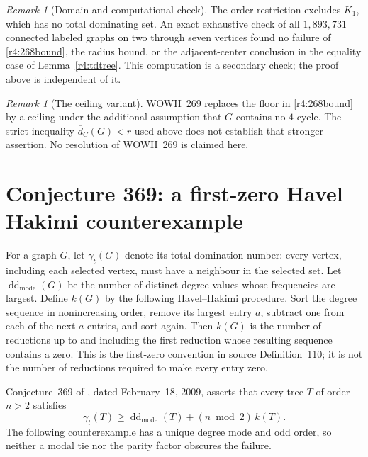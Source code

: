 \documentclass[11pt,a4paper]{article}
\theoremstyle{remark}
\newtheorem{remark}[theorem]{Remark}
\begin{document}
\begin{remark}[Domain and computational check]
\label{r4:268check}
The order restriction excludes $K_1$, which has no total dominating set.
An exact exhaustive check of all $1{,}893{,}731$ connected labeled graphs
on two through seven vertices found no failure of
\eqref{r4:268bound}, the radius bound, or the adjacent-center conclusion
in the equality case of Lemma~\ref{r4:tdtree}.
This computation is a secondary check; the proof above is independent
of it.
\end{remark}

\begin{remark}[The ceiling variant]
\label{r4:269open}
WOWII~269 replaces the floor in \eqref{r4:268bound} by a ceiling under
the additional assumption that $G$ contains no $4$-cycle.
The strict inequality $\overline d_C(G)<r$ used above does not establish
that stronger assertion.  No resolution of WOWII~269 is claimed here.
\end{remark}



\section{Conjecture 369: a first-zero Havel--Hakimi counterexample}
\label{r4:sec369}

For a graph $G$, let $\gamma_t(G)$ denote its total domination number:
every vertex, including each selected vertex, must have a neighbour in the
selected set.  Let $\operatorname{dd}_{\mathrm{mode}}(G)$ be the number of
distinct degree values whose frequencies are largest.  Define $k(G)$ by
the following Havel--Hakimi procedure.  Sort the degree sequence in
nonincreasing order, remove its largest entry $a$, subtract one from each
of the next $a$ entries, and sort again.  Then $k(G)$ is the number of
reductions up to and including the first reduction whose resulting
sequence contains a zero.  This is the first-zero convention in source
Definition~110; it is not the number of reductions required to make every
entry zero.

Conjecture~369 of \cite{WOWII}, dated February~18, 2009, asserts that every
tree $T$ of order $n>2$ satisfies
\begin{equation}
  \gamma_t(T)\ge
  \operatorname{dd}_{\mathrm{mode}}(T)+(n\bmod 2)\,k(T).
  \label{r4:369-assertion}
\end{equation}
The following counterexample has a unique degree mode and odd order, so
neither a modal tie nor the parity factor obscures the failure.
\end{document}
